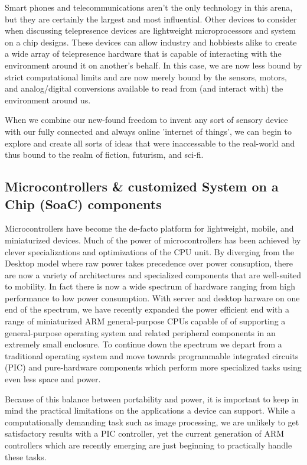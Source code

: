 \documentclass[a4paper,12pt]{report}
\begin{document}
Smart phones and telecommunications aren't the only technology in this arena, but they are certainly the largest and most influential. Other devices to consider when discussing telepresence devices are lightweight microprocessors and system on a chip designs. These devices can allow industry and hobbiests alike to create a wide array of telepresence hardware that is capable of interacting with the environment around it on another's behalf. In this case, we are now less bound by strict computational limits and are now merely bound by the sensors, motors, and analog/digital conversions available to read from (and interact with) the environment around us.

When we combine our new-found freedom to invent any sort of sensory device with our fully connected and always online 'internet of things', we can begin to explore and create all sorts of ideas that were inaccessable to the real-world and thus bound to the realm of fiction, futurism, and sci-fi.
\subsection{Microcontrollers \& customized System on a Chip (SoaC) components}

Microcontrollers have become the de-facto platform for lightweight, mobile, and miniaturized devices. Much of the power of microcontrollers has been achieved by clever specializations and optimizations of the CPU unit. By diverging from the Desktop model where raw power takes precedence over power consuption, there are now a variety of architectures and specialized components that are well-suited to mobility. In fact there is now a wide spectrum of hardware ranging from high performance to low power consumption. With server and desktop harware on one end of the spectrum, we have recently expanded the power efficient end with a range of miniaturized ARM general-purpose CPUs capable of of supporting a general-purpose operating system and related peripheral components in an extremely small enclosure. To continue down the spectrum we depart from a traditional operating system and move towards programmable integrated circuits (PIC) and pure-hardware components which perform more specialized tasks using even less space and power.

Because of this balance between portability and power, it is important to keep in mind the practical limitations on the applications a device can support. While a computationally demanding task such as image processing, we are unlikely to get satisfactory results with a PIC controller, yet the current generation of ARM controllers which are recently emerging are just beginning to practically handle these tasks.
\end{document}
